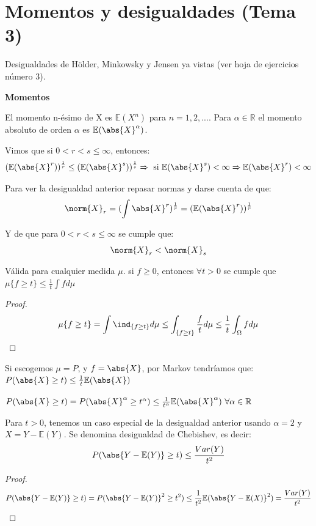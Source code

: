 \documentclass{apuntes}
\begin{document}
\chapter{Momentos y desigualdades (Tema 3)}
Desigualdades de Hölder, Minkowsky y Jensen ya vistas (ver hoja de ejercicios número 3).

\textbf{Momentos}

\begin{defn}
El momento n-ésimo de X es $\mathbb{E}(X^n)$ para $n=1,2,...$.  Para $\alpha \in \mathbb{R}$ el momento absoluto de orden $\alpha$ es $\mathbb{E}(\abs{X}^{\alpha})$.

Vimos que si $0 < r < s \leq \infty$, entonces:
\[
(\mathbb{E}(\abs{X}^r))^{\frac{1}{r}} \leq (\mathbb{E}(\abs{X}^s))^{\frac{1}{s}} \Rightarrow \text{ si } \mathbb{E}(\abs{X}^s) < \infty \Rightarrow \mathbb{E}(\abs{X}^r) < \infty
\] 

\begin{expla}
Para ver la desigualdad anterior repasar normas y darse cuenta de que:
\[
\norm{X}_r = (\int \abs{X}^r)^{\frac{1}{r}} = (\mathbb{E}(\abs{X}^r))^{\frac{1}{r}}
\]

Y de que para $0 < r < s \leq \infty$ se cumple que:
\[
\norm{X}_r < \norm{X}_s
\]
\end{expla}
\end{defn}

\begin{defn}
Válida para cualquier medida $\mu$. si $f \geq 0$, entonces $\forall t > 0$ se cumple que $\mu\{f \geq t\} \leq \frac{1}{t}\int f d\mu$

\begin{proof}
\[
\mu\{f \geq t\} = \int \ind_{\{f \geq t\}} d\mu \leq \int_{\{f \geq t\}} \frac{f}{t} d\mu \leq \frac{1}{t}\int_{\Omega}f d\mu
\]
\end{proof}

Si escogemos $\mu=P$, y $f=\abs{X}$, por Markov tendríamos que: $P(\abs{X}\geq t) \leq \frac{1}{t} \mathbb{E}(\abs{X})$
\end{defn}

\obs $P(\abs{X}\geq t) = P(\abs{X}^{\alpha}\geq t^{\alpha}) \leq \frac{1}{t^{\alpha}} \mathbb{E}(\abs{X}^{\alpha}) \text{ } \forall \alpha \in \mathbb{R}$

\obs Para $t>0$, tenemos un caso especial de la desigualdad anterior usando $\alpha=2$ y $X=Y-\mathbb{E}(Y)$. Se denomina desigualdad de Chebishev, es decir:
\[
P(\abs{Y-\mathbb{E}(Y)}\geq t) \leq \frac{Var(Y)}{t^2}
\]
\begin{proof}
\[
P(\abs{Y-\mathbb{E}(Y)}\geq t) = P(\abs{Y-\mathbb{E}(Y)}^2\geq t^2) \leq \frac{1}{t^2}\mathbb{E}(\abs{Y-\mathbb{E}(X)}^2) = \frac{Var(Y)}{t^2}
\]
\end{proof}
\end{document}
